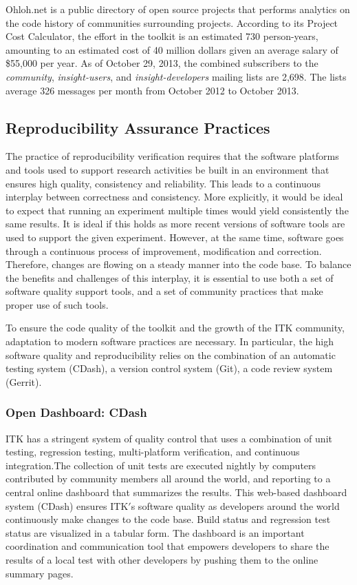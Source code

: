 \documentclass{frontiersENG} %
\begin{document}
Ohloh.net \cite{OhlohITK2013} is a public directory of open source projects
that performs analytics on the code history of communities surrounding
projects. According to its Project Cost Calculator, the effort in the toolkit
is an estimated 730 person-years, amounting to an estimated cost of 40 million
dollars given an average salary of \$55,000 per year.  As of October 29, 2013,
the combined subscribers to the \textit{community}, \textit{insight-users}, and
\textit{insight-developers} mailing lists are 2,698.  The lists average 326
messages per month from October 2012 to October 2013.


\subsection{Reproducibility Assurance Practices}
The practice of reproducibility verification requires that the software
platforms and tools used to support research activities be built in an
environment that ensures high quality, consistency and reliability. This
leads to a continuous interplay between correctness and consistency. More
explicitly, it would be ideal to expect that running an experiment multiple times
would yield consistently the same results. It is ideal if this holds as more
recent versions of software tools are used to support the given experiment.
However, at the same time, software goes through a continuous process of
improvement, modification and correction. Therefore, changes are flowing on a
steady manner into the code base. To balance the benefits and challenges of
this interplay, it is essential to use both a set of software quality support
tools, and a set of community practices that make proper use of such tools.

To ensure the code quality of the toolkit and the growth of the ITK community,
adaptation to modern software practices are necessary. In particular, the high
software quality and reproducibility relies on the combination of an automatic
testing system (CDash), a version control system (Git), a code review system
(Gerrit).

\subsubsection{Open Dashboard: CDash}
ITK has a stringent system of quality control that uses a combination of unit
testing, regression testing, multi-platform verification, and continuous
integration.The collection of unit tests are executed nightly by computers
contributed by community members all around the world, and reporting to a
central online dashboard that summarizes the results. This web-based dashboard
system (CDash) \cite{ITKDashboard} ensures ITK$'$s software quality as
developers around the world continuously make changes to the code base. Build
status and regression test status are visualized in a tabular form. The
dashboard is an important coordination and communication tool that empowers
developers to share the results of a local test with other developers by
pushing them to the online summary pages.
\end{document}

